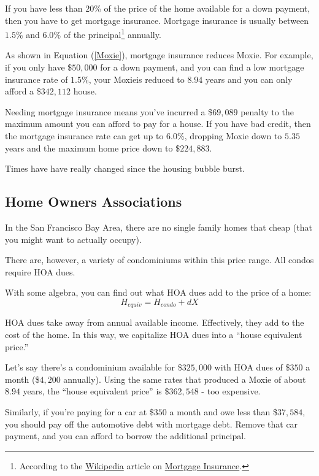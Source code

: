 \documentclass{article}
\begin{document}
If you have
less than $20$\% of the price of the home available for a down payment,
then you have to get mortgage insurance. Mortgage 
insurance is usually
between $1.5$\% and $6.0$\% of the 
principal\footnote{According to the 
\href{http://en.wikipedia.org/wiki/Main_Page}{Wikipedia}
article on 
\href{http://en.wikipedia.org/wiki/Mortgage_insurance}{Mortgage Insurance}.} 
 annually. 

As shown in Equation (\ref{Moxie}), mortgage insurance 
reduces Moxie. For example, if you only have \$$50,000$ for a down
payment, and you can find a low mortgage insurance rate of $1.5$\%,
your Moxieis reduced to $8.94$ years and you can only 
afford a \$$342,112$ house.

Needing mortgage insurance means you've incurred a \$$69,089$ penalty
to the maximum amount you can afford to pay for a house. 
If you have bad credit, then the mortgage
insurance rate can get up to $6.0$\%, dropping Moxie down to $5.35$
years and the maximum home price down to \$$224,883$. 

Times have
have really changed since the housing bubble burst.

\subsection{Home Owners Associations}

In the San Francisco Bay Area, there are no single family homes
 that cheap (that you might want to actually occupy).

  There are, however, a variety of condominiums within this 
price range.  All condos require HOA dues.  

With some 
algebra, you can find out what HOA dues add to the price of a home:
\begin{equation}
H_{equiv} = H_{condo} + dX
\end{equation}

HOA dues take away from annual available income.  Effectively, 
they add to the cost of the home.  In this way, we capitalize 
HOA dues into a ``house equivalent price.''

Let's say there's a condominium available for \$$325,000$ with 
HOA dues of \$$350$ a month (\$$4,200$ annually).  Using the
same rates that produced a Moxie of about $8.94$ years, 
the ``house equivalent price'' is  \$$362,548$ - too expensive.

Similarly, if you're paying for a car at \$$350$ a month and 
owe less than \$$37,584$, you should pay off the automotive debt 
with mortgage debt. Remove that car payment, and you can  
afford to borrow the additional principal.
\end{document}
